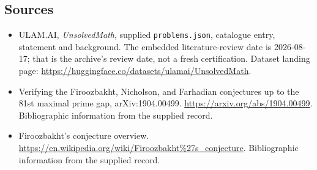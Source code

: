 \documentclass[11pt,a4paper]{article}
\begin{document}
\subsection{Sources}

{\small

\begin{itemize}

\item[\hypertarget{source:statement:1}{S1}] ULAM.AI, \emph{UnsolvedMath}, supplied \texttt{problems.json}, catalogue entry, statement and background. The embedded literature-review date is 2026-08-17; that is the archive’s review date, not a fresh certification. Dataset landing page: \url{https://huggingface.co/datasets/ulamai/UnsolvedMath}.

\item[\hypertarget{source:statement:2}{S2}] Verifying the Firoozbakht, Nicholson, and Farhadian conjectures up to the 81st maximal prime gap, arXiv:1904.00499. \url{https://arxiv.org/abs/1904.00499}. Bibliographic information from the supplied record.

\item[\hypertarget{source:statement:3}{S3}] Firoozbakht's conjecture overview. \url{https://en.wikipedia.org/wiki/Firoozbakht%27s_conjecture}. Bibliographic information from the supplied record.

\end{itemize}

}

\label{end:statement}
\end{document}
